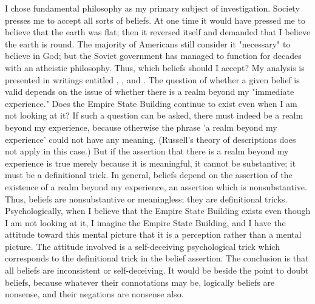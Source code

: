 I chose fundamental philosophy as my primary subject of investigation. 
Society presses me to accept all sorts of beliefs. At one time it would have 
pressed me to believe that the earth was flat; then it reversed itself and 
demanded that I believe the earth is round. The majority of Americans still 
consider it "necessary" to believe in God; but the Soviet government has 
managed to function for decades with an atheistic philosophy. Thus, which 
beliefs should I accept? My analysis is presented in writings entitled 
, , and 
. 
The question of whether a given belief is valid 
depends on the issue of whether there is a realm beyond my "immediate 
experience." Does the Empire State Building continue to exist even when I 
am not looking at it? If such a question can be asked, there must indeed be 
a realm beyond my experience, because otherwise the phrase 'a realm 
beyond my experience' could not have any meaning. (Russell's theory of 
descriptions does not apply in this case.) But if the assertion that there is a 
realm beyond my experience is true merely because it is meaningful, it 
cannot be substantive; it must be a definitional trick. In general, beliefs 
depend on the assertion of the existence of a realm beyond my experience, 
an assertion which is nonsubstantive. Thus, beliefs are nonsubstantive or 
meaningless; they are definitional tricks. Psychologically, when I believe that 
the Empire State Building exists even though I am not looking at it, I 
imagine the Empire State Building, and I have the attitude toward this 
mental picture that it is a perception rather than a mental picture. The 
attitude involved is a self-deceiving psychological trick which corresponds to 
the definitional trick in the belief assertion. The conclusion is that all beliefs 
are inconsistent or self-deceiving. It would be beside the point to doubt 
beliefs, because whatever their connotations may be, logically beliefs are 
nonsense, and their negations are nonsense also. 


